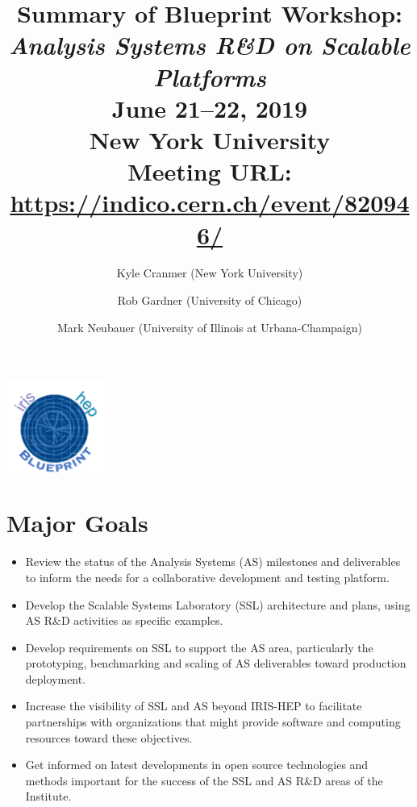 \documentclass[11pt,letterpaper,fleqn]{article}
\date{} %
\title{\large Summary of Blueprint Workshop: \\
\vspace{1pt}
\LARGE \textit{Analysis Systems R\&D on Scalable Platforms} \\
\color{black} \normalsize
\vspace{10pt}
June 21--22, 2019 \\
New York University \\
Meeting URL: \href{https://indico.cern.ch/event/820946/}{https://indico.cern.ch/event/820946/}
} %
\author{Kyle Cranmer {\normalfont(New York University)}
      \and  Rob Gardner {\normalfont(University of Chicago)}
      \and  Mark Neubauer {\normalfont(University of Illinois at Urbana-Champaign)}
      }
\begin{document}
\maketitle %
\normalfont

\thispagestyle{firststyle}

\vspace{-250pt}
\hspace{360pt}
\includegraphics[height=30mm]{../../../figures/iris-hep-bluprint-logo.png}

\vspace{120pt}
\section*{Major Goals}
\vspace{3pt}
\begin{itemize}
  \item Review the status of the Analysis Systems (AS) milestones and deliverables to inform the needs for a collaborative development and testing platform.
  \item Develop the Scalable Systems Laboratory (SSL) architecture and plans, using AS R\&D activities as specific examples.
  \item Develop requirements on SSL to support the AS area, particularly the prototyping, benchmarking and scaling of AS deliverables toward production deployment.
  \item Increase the visibility of SSL and AS beyond IRIS-HEP to facilitate partnerships with organizations that might provide software and computing resources toward these objectives.
  \item Get informed on latest developments in open source technologies and methods important for the success of the SSL and AS R\&D areas of the Institute.
\end{itemize}
\end{document}
